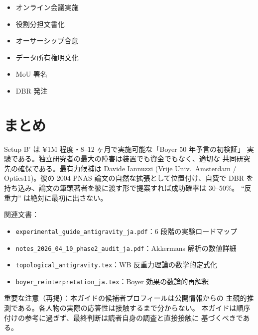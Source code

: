 \documentclass[11pt,a4paper]{article}
\def\textbf#1{#1}%
\begin{document}
\begin{itemize}
\item[$\square$] オンライン会議実施
\item[$\square$] 役割分担文書化
\item[$\square$] オーサーシップ合意
\item[$\square$] データ所有権明文化
\item[$\square$] MoU 署名
\item[$\square$] DBR 発注
\end{itemize}

\section{まとめ}

\begin{tcolorbox}[colback=green!5,colframe=green!50!black,title=本ガイドの一行まとめ]
Setup B' は \textbf{¥1M 程度・8--12 ヶ月}で実施可能な「Boyer 50 年予言の初検証」
実験である。独立研究者の最大の障害は装置でも資金でもなく、\textbf{適切な
共同研究先の確保}である。最有力候補は Davide Iannuzzi (Vrije Univ.\ Amsterdam
/ Optics11)。彼の 2004 PNAS 論文の自然な拡張として位置付け、自費で DBR を
持ち込み、論文の筆頭著者を彼に渡す形で提案すれば成功確率は 30--50\%。
``反重力'' は絶対に最初に出さない。
\end{tcolorbox}

\vspace{2em}

\textbf{関連文書}：
\begin{itemize}
\item \texttt{experimental\_guide\_antigravity\_ja.pdf}：6 段階の実験ロードマップ
\item \texttt{notes\_2026\_04\_10\_phase2\_audit\_ja.pdf}：Akkermans 解析の数値詳細
\item \texttt{topological\_antigravity.tex}：WB 反重力理論の数学的定式化
\item \texttt{boyer\_reinterpretation\_ja.tex}：Boyer 効果の数論的再解釈
\end{itemize}

\vspace{2em}

\textbf{重要な注意（再掲）}：本ガイドの候補者プロフィールは公開情報からの
主観的推測である。各人物の実際の応答性は接触するまで分からない。
本ガイドは順序付けの参考に過ぎず、最終判断は読者自身の調査と直接接触に
基づくべきである。
\end{document}
